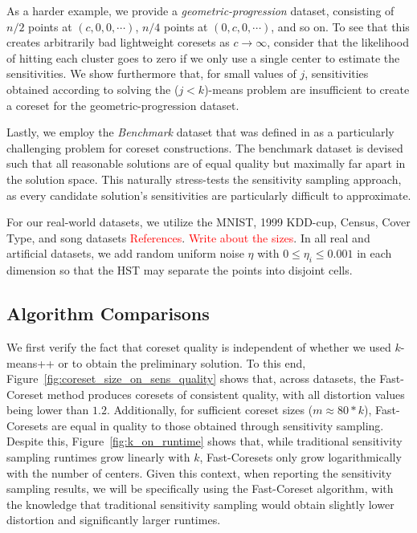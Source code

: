As a harder example, we provide a \emph{geometric-progression} dataset, consisting of $n/2$ points at $(c, 0, 0, \cdots)$, $n/4$ points at $(0, c, 0, \cdots)$,
and so on. To see that this creates arbitrarily bad lightweight coresets as $c \rightarrow \infty$, consider that the likelihood of hitting each cluster goes to
zero if we only use a single center to estimate the sensitivities. We show furthermore that, for small values of $j$, sensitivities obtained
according to solving the ($j<k$)-means problem are insufficient to create a coreset for the geometric-progression dataset.

Lastly, we employ the \emph{Benchmark} dataset that was defined in \cite{chrisESA} as a particularly challenging problem for coreset constructions.  The
benchmark dataset is devised such that all reasonable solutions are of equal quality but maximally far apart in the solution space. This naturally stress-tests
the sensitivity sampling approach, as every candidate solution's sensitivities are particularly difficult to approximate.

For our real-world datasets, we utilize the MNIST, 1999 KDD-cup, Census, Cover Type, and song datasets \textcolor{red}{References}. \textcolor{red}{Write about
the sizes}. In all real and artificial datasets, we add random uniform noise $\eta$ with $0 \leq \eta_i \leq 0.001$ in each dimension so that the HST may
separate the points into disjoint cells.

\subsection{Algorithm Comparisons}
\label{ssec:alg_qualities}

We first verify the fact that coreset quality is independent of whether we used $k$-means++ or \fkmeans to obtain the preliminary solution. To this end,
Figure~\ref{fig:coreset_size_on_sens_quality} shows that, across datasets, the Fast-Coreset method produces coresets of consistent quality, with all distortion
values being lower than $1.2$. Additionally, for sufficient coreset sizes ($m \approx 80 * k$), Fast-Coresets are equal in quality to those obtained through
sensitivity sampling. Despite this, Figure~\ref{fig:k_on_runtime} shows that, while traditional sensitivity sampling runtimes grow linearly with $k$,
Fast-Coresets only grow logarithmically with the number of centers. Given this context, when reporting the sensitivity sampling results, we will be
specifically using the Fast-Coreset algorithm, with the knowledge that traditional sensitivity sampling would obtain slightly lower distortion and significantly
larger runtimes.

